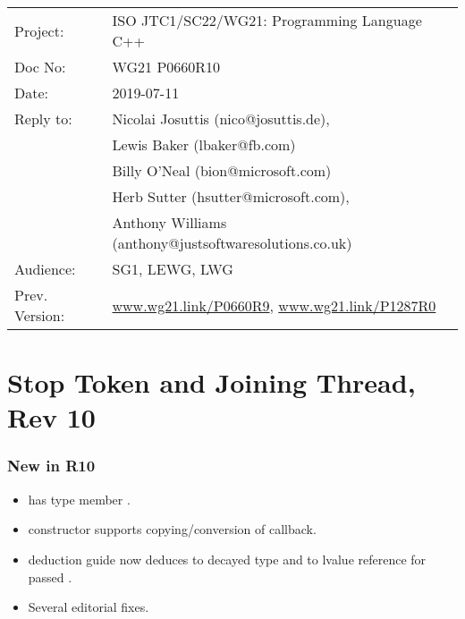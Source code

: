 
{\small
\begin{tabular}{@{}ll}
Project:  	& ISO JTC1/SC22/WG21: Programming Language C++ \\
Doc No: 	& WG21 P0660R10 \\
Date: 		& 2019-07-11 \\
Reply to: 	& Nicolai Josuttis (nico@josuttis.de), \\
                &         Lewis Baker (lbaker@fb.com) \\
                &         Billy O'Neal (bion@microsoft.com) \\
                &         Herb Sutter (hsutter@microsoft.com), \\
                &         Anthony Williams (anthony@justsoftwaresolutions.co.uk) \\
Audience: 	& SG1, LEWG, LWG \\
Prev. Version:	& \url{www.wg21.link/P0660R9}, \url{www.wg21.link/P1287R0} \\
\end{tabular}
}

\section*{{\huge{}Stop Token and Joining Thread, Rev 10}}

\subsubsection*{New in R10}
\begin{itemize}
 \item {} has type member .
 \item {} constructor supports copying/conversion of callback.
 \item {} deduction guide now deduces to decayed type
       and to lvalue reference for passed .
 \item Several editorial fixes.
\end{itemize}

